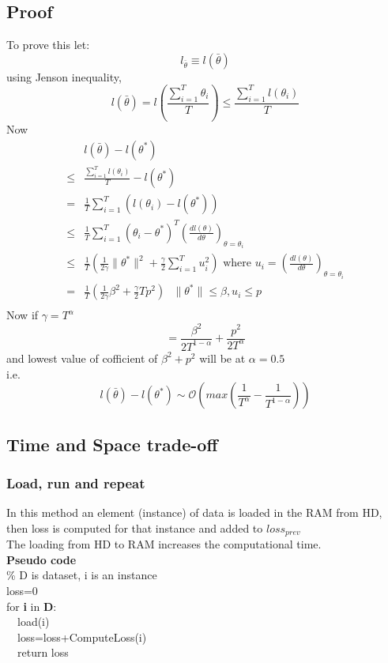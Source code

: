 \documentclass[11pt, twosides]{article}
\begin{document}
	\subsection{Proof}
	To prove this let:
	\[l_{\bar{\theta}}\equiv l(\bar{\theta})\]
	using Jenson inequality,
	\[l({\bar{\theta}})=l\left( \frac{\sum_{i=1}^{T}\theta_{i}}{T}\right) \leq  \frac{\sum_{i=1}^{T}l(\theta_{i})}{T}\]
	Now
	\begin{align}
		 &l(\bar{\theta})-l({\theta}^*)\nonumber\\
		 \leq &\frac{\sum_{i=1}^{T}l(\theta_{i})}{T}-l({\theta}^*)\nonumber\\
		 =&\frac{1}{T}\sum_{i=1}^{T}\left(l(\theta_{i})-l({\theta}^*)\right)\nonumber\\
		 \leq &\frac{1}{T}\sum_{i=1}^{T}(\theta_i-\theta^*)^T\left(\frac{dl(\theta)}{d\theta}\right)_{\theta=\theta_i}\nonumber\\
		 \leq
		 &\frac{1}{T}\left(\frac{1}{2\gamma}\|\theta^*\|^2+\frac{\gamma}{2}\sum_{i=1}^{T}u_i^2\right) \text{\ \ \ \ \ \ \ \           where }u_i=\left(\frac{dl(\theta)}{d\theta}\right)_{\theta=\theta_i}\nonumber\\
		 =&\frac{1}{T}\left(\frac{1}{2\gamma}\beta^2+\frac{\gamma}{2}Tp^2\right)\text{\ \ \ \ \ \ \ }\|\theta^*\| \leq\beta, u_i\leq p \nonumber\\
	\end{align}
Now if $\gamma=T^\alpha$
\[=\frac{\beta^2}{2T^{1-\alpha}}+\frac{p^2}{2T^\alpha}\]
and lowest value of cofficient of $\beta^2+p^2$ will be at $\alpha=0.5$ \\
i.e.
\[l(\bar{\theta})-l({\theta}^*) \sim \mathcal{O}\left( max\left(\frac{1}{T^\alpha}-\frac{1}{T^{1-\alpha}}\right)\right) \] 

\subsection{Time and Space trade-off}
\subsubsection{Load, run and repeat}
In this method an element (instance) of data is loaded in the RAM from HD, then loss is computed for that instance and added to $loss_{prev}$\\
The loading from HD to RAM increases the computational time.\\

\textbf{Pseudo code}\\
\% D is dataset, i is an instance\\
loss=0\\
for \textbf{i} in \textbf{D}:\\
\ \ load(i)\\
\ \ loss=loss+ComputeLoss(i)\\
\ \ return loss\\
\end{document}
